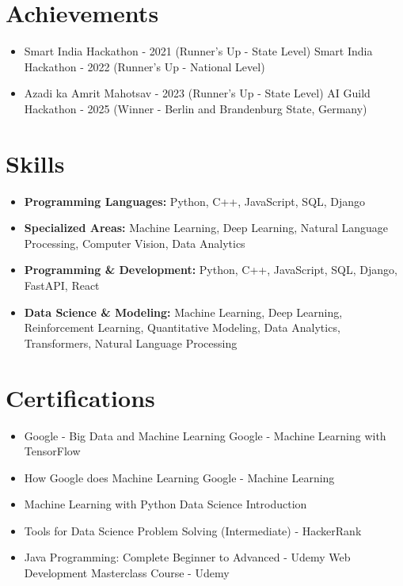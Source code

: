 \documentclass[a4paper,10pt]{article}
\begin{document}
\section*{Achievements}
\begin{itemize}
\item Smart India Hackathon - 2021 (Runner's Up - State Level) \hfill Smart India Hackathon - 2022 (Runner's Up - National Level)
\item Azadi ka Amrit Mahotsav - 2023 (Runner's Up - State Level) \hfill AI Guild Hackathon - 2025 (Winner - Berlin and Brandenburg State, Germany)
\end{itemize}

\section*{Skills}
\begin{itemize}
  \item \textbf{Programming Languages:} Python, C++, JavaScript, SQL, Django
  \item \textbf{Specialized Areas:} Machine Learning, Deep Learning, Natural Language Processing, Computer Vision, Data Analytics
  \item \textbf{Programming \& Development:} Python, C++, JavaScript, SQL, Django, FastAPI, React
  \item \textbf{Data Science \& Modeling:} Machine Learning, Deep Learning, Reinforcement Learning, Quantitative Modeling, Data Analytics, Transformers, Natural Language Processing
\end{itemize}

\section*{Certifications}
\begin{itemize}
\item Google - Big Data and Machine Learning \hfill Google - Machine Learning with TensorFlow
\item How Google does Machine Learning \hfill Google - Machine Learning
\item Machine Learning with Python \hfill Data Science Introduction
\item Tools for Data Science \hfill Problem Solving (Intermediate) - HackerRank
\item Java Programming: Complete Beginner to Advanced - Udemy \hfill Web Development Masterclass Course - Udemy
\end{itemize}
\end{document}
